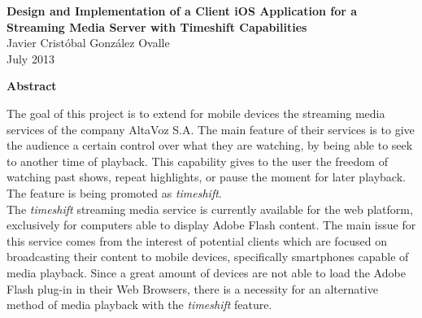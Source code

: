 \newpage
\thispagestyle{empty}
\begin{center}
 \Large \textbf{Design and Implementation of a Client iOS Application for a Streaming Media Server with Timeshift Capabilities}\\
  

\normalsize Javier Cristóbal González Ovalle \\
\normalsize July 2013

\Large \textbf{Abstract}

\end{center}
\normalsize

The goal of this project is to extend for mobile devices the streaming media services of the company AltaVoz S.A. The main feature of their services is to give the audience a certain control over what they are watching, by being able to seek to another time of playback. This capability gives to the user the freedom of watching past shows, repeat highlights, or pause the moment for later playback. The feature is being promoted as \textit{timeshift}.\\



The \textit{timeshift} streaming media service is currently available for the web platform, exclusively for computers able to display Adobe Flash content. The main issue for this service comes from the interest of potential clients which are focused on broadcasting their content to mobile devices, specifically smartphones capable of media playback. Since a great amount of devices are not able to load the Adobe Flash plug-in in their Web Browsers, there is a necessity for an alternative method of media playback with the \textit{timeshift} feature.\\

